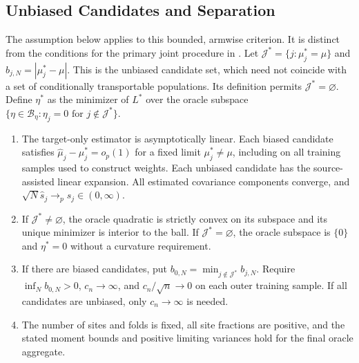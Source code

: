 \documentclass[12pt]{article}
\begin{document}
\subsection{Unbiased Candidates and Separation}\label{supp:aggregation_informative_indices}
The assumption below applies to this bounded, armwise criterion. It is distinct from the conditions for the primary joint procedure in .
Let $\mathcal J^*=\{j:\mu_j^*=\mu\}$ and $b_{j,N}=|\mu_j^*-\mu|$. This is the unbiased candidate set, which need not coincide with a set of conditionally transportable populations. Its definition permits $\mathcal J^*=\varnothing$. Define $\eta^*$ as the minimizer of $L^*$ over the oracle subspace $\{\eta\in\mathcal B_\eta:\eta_j=0\text{ for }j\notin\mathcal J^*\}$.

\begin{assumption}\label{asmp:agg_regular}
\begin{enumerate}[label=(\alph*),leftmargin=*]
\item The target-only estimator is asymptotically linear. Each biased candidate satisfies $\widehat\mu_j-\mu_j^*=o_p(1)$ for a fixed limit $\mu_j^*\ne\mu$, including on all training samples used to construct weights. Each unbiased candidate has the source-assisted linear expansion. All estimated covariance components converge, and $\sqrt N\widehat s_j\to_p s_j\in(0,\infty)$.
\item If $\mathcal J^*\ne\varnothing$, the oracle quadratic is strictly convex on its subspace and its unique minimizer is interior to the ball. If $\mathcal J^*=\varnothing$, the oracle subspace is $\{0\}$ and $\eta^*=0$ without a curvature requirement.
\item If there are biased candidates, put $b_{0,N}=\min_{j\notin\mathcal J^*}b_{j,N}$. Require $\inf_N b_{0,N}>0$, $c_n\to\infty$, and $c_n/\sqrt n\to0$ on each outer training sample. If all candidates are unbiased, only $c_n\to\infty$ is needed.
\item The number of sites and folds is fixed, all site fractions are positive, and the stated moment bounds and positive limiting variances hold for the final oracle aggregate.
\end{enumerate}
\end{assumption}
\end{document}
